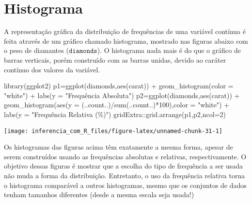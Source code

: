 \documentclass[
]{book}
\newenvironment{Shaded}{\begin{snugshade}}{\end{snugshade}}
\newcommand{\AttributeTok}[1]{\textcolor[rgb]{0.77,0.63,0.00}{#1}}
\newcommand{\DecValTok}[1]{\textcolor[rgb]{0.00,0.00,0.81}{#1}}
\newcommand{\FunctionTok}[1]{\textcolor[rgb]{0.00,0.00,0.00}{#1}}
\newcommand{\NormalTok}[1]{#1}
\newcommand{\OtherTok}[1]{\textcolor[rgb]{0.56,0.35,0.01}{#1}}
\newcommand{\SpecialCharTok}[1]{\textcolor[rgb]{0.00,0.00,0.00}{#1}}
\newcommand{\StringTok}[1]{\textcolor[rgb]{0.31,0.60,0.02}{#1}}
\begin{document}
\hypertarget{histograma}{%
\section{Histograma}\label{histograma}}

A representação gráfica da distribuição de frequências de uma variável contínua é feita através de um gráfico chamado histograma, mostrado nas figuras abaixo com o peso de diamantes (\(\texttt{diamonds}\)). O histograma nada mais é do que o gráfico de barras verticais, porém construído com as barras unidas, devido ao caráter contínuo dos valores da variável.

\begin{Shaded}
\begin{Highlighting}[]
\FunctionTok{library}\NormalTok{(ggplot2)}
\NormalTok{p1}\OtherTok{=}\FunctionTok{ggplot}\NormalTok{(diamonds,}\FunctionTok{aes}\NormalTok{(carat)) }\SpecialCharTok{+}
  \FunctionTok{geom\_histogram}\NormalTok{(}\AttributeTok{color =} \StringTok{"white"}\NormalTok{) }\SpecialCharTok{+}
  \FunctionTok{labs}\NormalTok{(}\AttributeTok{y =} \StringTok{"Frequência Absoluta"}\NormalTok{)}
\NormalTok{p2}\OtherTok{=}\FunctionTok{ggplot}\NormalTok{(diamonds,}\FunctionTok{aes}\NormalTok{(carat)) }\SpecialCharTok{+}
  \FunctionTok{geom\_histogram}\NormalTok{(}\FunctionTok{aes}\NormalTok{(}\AttributeTok{y =}\NormalTok{ (..count..)}\SpecialCharTok{/}\FunctionTok{sum}\NormalTok{(..count..)}\SpecialCharTok{*}\DecValTok{100}\NormalTok{),}\AttributeTok{color =} \StringTok{"white"}\NormalTok{) }\SpecialCharTok{+}
  \FunctionTok{labs}\NormalTok{(}\AttributeTok{y =} \StringTok{"Frequência Relativa (\%)"}\NormalTok{)}
\NormalTok{gridExtra}\SpecialCharTok{::}\FunctionTok{grid.arrange}\NormalTok{(p1,p2,}\AttributeTok{ncol=}\DecValTok{2}\NormalTok{)}
\end{Highlighting}
\end{Shaded}

\begin{center}\texttt{[image: inferencia\_com\_R\_files/figure-latex/unnamed-chunk-31-1]} \end{center}

Os histogramas das figuras acima têm exatamente a mesma forma, apesar de serem construídos usando as frequências absolutas e relativas, respectivamente. O objetivo dessas figuras é mostrar que a escolha do tipo de frequência a ser usada não muda a forma da distribuição. Entretanto, o uso da frequência relativa torna o histograma comparável a outros histogramas, mesmo que os conjuntos de dados tenham tamanhos diferentes (desde a mesma escala seja usada!)
\end{document}
